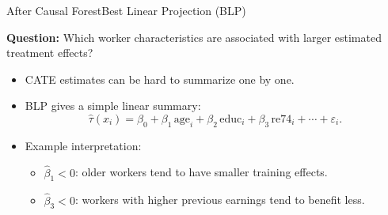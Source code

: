 \documentclass[hyperref={pdfpagelabels=false}]{beamer}
\begin{document}
\begin{frame}{After Causal Forest}{Best Linear Projection (BLP)}

\textbf{Question:} Which worker characteristics are associated with larger estimated treatment effects?

\vspace{0.2cm}

\begin{itemize}
  \item CATE estimates can be hard to summarize one by one.
  \vspace{0.15cm}
  \item BLP gives a simple linear summary:
  \[
    \hat{\tau}(x_i)
    =
    \beta_0
    +\beta_1\,\text{age}_i
    +\beta_2\,\text{educ}_i
    +\beta_3\,\text{re74}_i
    +\cdots
    +\varepsilon_i.
  \]
  \vspace{0.15cm}
  \item Example interpretation:
  \vspace{0.1cm}
  \begin{itemize}
    \item $\hat{\beta}_1<0$: older workers tend to have smaller training effects.
    \vspace{0.1cm}
    \item $\hat{\beta}_3<0$: workers with higher previous earnings tend to benefit less.
  \end{itemize}
\end{itemize}

\vspace{0.2cm}

\begin{center}
\end{center}

\end{frame}
\end{document}
